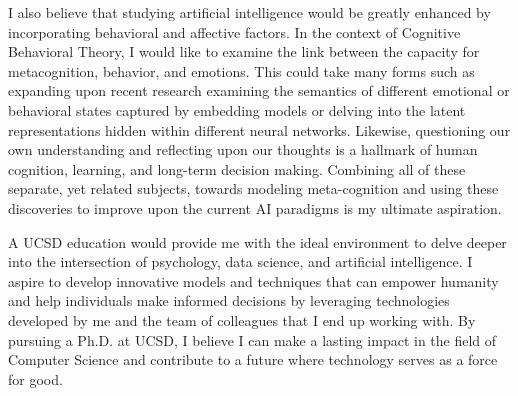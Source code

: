 \documentclass[12pt]{article}
\begin{document}
I also believe that studying artificial intelligence would be greatly enhanced by incorporating behavioral and affective factors. In the
context of Cognitive Behavioral Theory, I would like to examine the link between the capacity for metacognition, behavior, and emotions.
This could take many forms such as expanding upon recent research examining the semantics of different emotional or behavioral states
captured by embedding models or delving into the latent representations hidden within different neural networks.  Likewise, questioning our
own understanding and reflecting upon our thoughts is a hallmark of human cognition, learning, and long-term decision making. Combining all
of these separate, yet related subjects, towards modeling meta-cognition and using these discoveries to improve upon the current AI
paradigms is my ultimate aspiration.

A UCSD education would provide me with the ideal environment to delve deeper into the intersection of psychology, data science, and
artificial intelligence. I aspire to develop innovative models and techniques that can empower humanity and help individuals make informed
decisions by leveraging technologies developed by me and the team of colleagues that I end up working with. By pursuing a Ph.D. at UCSD, I
believe I can make a lasting impact in the field of Computer Science and contribute to a future where technology serves as a force for good.
\end{document}
